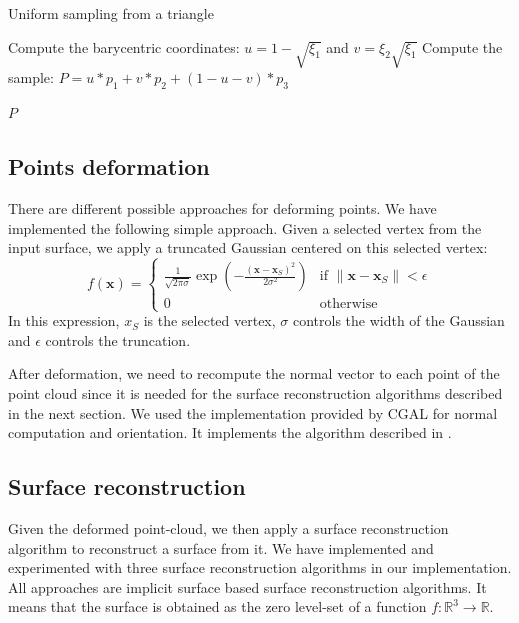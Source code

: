 \documentclass[ams]{U-AizuGT}
\def\x{\mathbf{x}}
\def\R{\mathbb{R}}
\begin{document}
\begin{algorithm}
\caption{Uniform sampling from a triangle}
\label{alg:sample}
\begin{algorithmic}


\State Compute the barycentric coordinates: $u = 1-\sqrt{\xi_1}$ 
and $v = \xi_2 \sqrt{\xi_1}$
\State Compute the sample: $P = u * p_1 + v * p_2 + (1 - u - v) * p_3$

\Return $P$
\EndFunction
\end{algorithmic}
\end{algorithm}
  

\subsection{Points deformation}
There are different possible approaches for deforming points. We have implemented the following simple approach.
Given a selected vertex from the input surface, we apply a truncated Gaussian centered on this selected vertex:
\[
f(\x)=
\begin{cases}
\frac{1}{\sqrt{2\pi\sigma}} \exp\left(- \frac{(\x- \x_S)^{2}}{2 \sigma^{2}}\right) & \text{if } \|\x-\x_S\| < \epsilon \\
0 & \text{otherwise}
\end{cases}
\]
In this expression, $x_S$ is the selected vertex, $\sigma$ controls the width of the Gaussian and $\epsilon$ controls 
the truncation.

After deformation, we need to recompute the normal vector to each point of the point cloud 
since it is needed for the surface reconstruction algorithms described in the next section.
We used the implementation provided by CGAL \cite{cgal} for normal computation and orientation.
It implements the algorithm described in \cite{HRDMS92}.

\subsection{Surface reconstruction}
Given the deformed point-cloud, we then apply a surface reconstruction algorithm to reconstruct a surface from it. 
We have implemented and experimented with three surface reconstruction algorithms in our implementation.
All approaches are implicit surface based surface reconstruction algorithms. 
It means that the surface is obtained as the zero level-set of a function $f: \R^3 \rightarrow \R$. 
\end{document}
